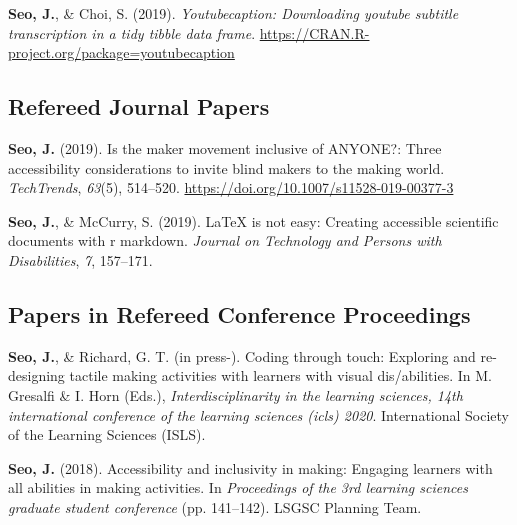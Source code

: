 \documentclass[11pt, a4paper]{awesome-cv}
\begin{document}
\leavevmode\hypertarget{ref-R-youtubecaption}{}%
\textbf{Seo, J.}, \& Choi, S. (2019). \emph{Youtubecaption: Downloading youtube subtitle transcription in a tidy tibble data frame}. \url{https://CRAN.R-project.org/package=youtubecaption}

\endgroup

\hypertarget{refereed-journal-papers}{%
\subsection{Refereed Journal Papers}\label{refereed-journal-papers}}

\begingroup
\setlength{\parindent}{-0.5in}
\setlength{\leftskip}{0.5in}

\hypertarget{refs_journals}{}
\leavevmode\hypertarget{ref-seo2019maker}{}%
\textbf{Seo, J.} (2019). Is the maker movement inclusive of ANYONE?: Three accessibility considerations to invite blind makers to the making world. \emph{TechTrends}, \emph{63}(5), 514--520. \url{https://doi.org/10.1007/s11528-019-00377-3}

\leavevmode\hypertarget{ref-seo2019arow}{}%
\textbf{Seo, J.}, \& McCurry, S. (2019). LaTeX is not easy: Creating accessible scientific documents with r markdown. \emph{Journal on Technology and Persons with Disabilities}, \emph{7}, 157--171.

\endgroup

\hypertarget{papers-in-refereed-conference-proceedings}{%
\subsection{Papers in Refereed Conference Proceedings}\label{papers-in-refereed-conference-proceedings}}

\begingroup
\setlength{\parindent}{-0.5in}
\setlength{\leftskip}{0.5in}

\hypertarget{refs_proceedings}{}
\leavevmode\hypertarget{ref-seo2020coding}{}%
\textbf{Seo, J.}, \& Richard, G. T. (in press-). Coding through touch: Exploring and re-designing tactile making activities with learners with visual dis/abilities. In M. Gresalfi \& I. Horn (Eds.), \emph{Interdisciplinarity in the learning sciences, 14th international conference of the learning sciences (icls) 2020}. International Society of the Learning Sciences (ISLS).

\leavevmode\hypertarget{ref-seo2018making}{}%
\textbf{Seo, J.} (2018). Accessibility and inclusivity in making: Engaging learners with all abilities in making activities. In \emph{Proceedings of the 3rd learning sciences graduate student conference} (pp. 141--142). LSGSC Planning Team.
\end{document}
